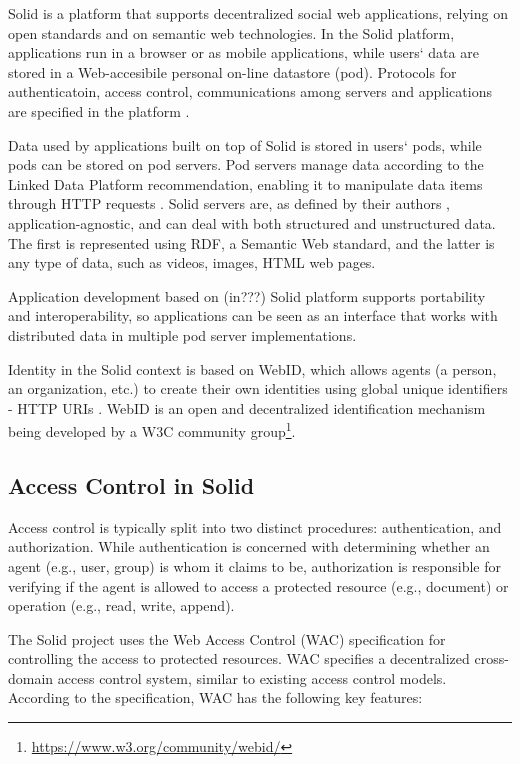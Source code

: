 \documentclass[sigconf]{acmart}
\begin{document}
Solid is a platform that supports decentralized social web applications, relying on open standards and on semantic web technologies. In the Solid platform, applications run in a browser or as mobile applications, while users` data are stored in a Web-accesibile personal on-line datastore (pod). Protocols for authenticatoin, access control, communications among servers and applications are specified in the platform \cite{Sambra2016}.

Data used by applications built on top of Solid is stored in users` pods, while pods can be stored on pod servers. Pod servers manage data according to the Linked Data Platform recommendation, enabling it to manipulate data items through HTTP requests \cite{LDP}. Solid servers are, as defined by their authors \cite{Sambra2016}, application-agnostic, and can deal with both structured and unstructured data. The first is represented using RDF, a Semantic Web standard, and the latter is any type of data, such as videos, images, HTML web pages.

Application development based on (in???) Solid platform supports portability and interoperability, so applications can be seen as an interface that works with distributed data in multiple pod server implementations.

Identity in the Solid context is based on WebID, which allows agents (a person, an organization, etc.) to create their own identities using global unique identifiers - HTTP URIs \cite{Sambra2016solid}. WebID is an open and decentralized identification mechanism being developed by a W3C community group\footnote{\url{https://www.w3.org/community/webid/}}.

\subsection{Access Control in Solid}

Access control is typically split into two distinct procedures: authentication, and authorization. While authentication is concerned with determining whether an agent (e.g., user, group) is whom it claims to be, authorization is responsible for verifying if the agent is allowed to access a protected resource (e.g., document) or operation (e.g., read, write, append).

The Solid project uses the Web Access Control (WAC) specification for controlling the access to protected resources. WAC specifies a decentralized cross-domain access control system, similar to existing access control models. According to the specification, WAC has the following key features:
\end{document}
